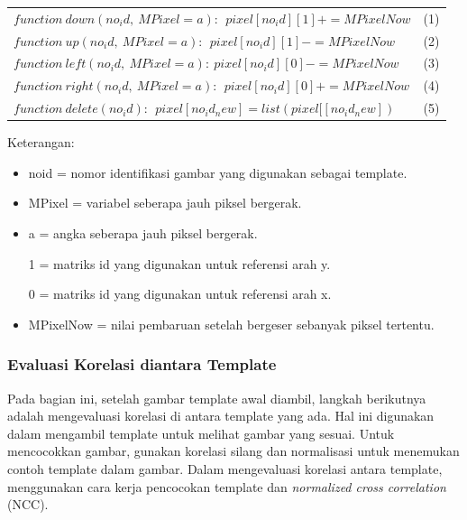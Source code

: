 \begin{table}[H]
	\begin{tabular}{lr}
		$function\ down\left(no_id,\ MPixel=a\right):\ \ pixel\left[no_id\right]\left[1\right]+=MPixelNow$ & (1) \\
		
		$function\ up\left(no_id,\ MPixel=a\right):\ \ pixel\left[no_id\right]\left[1\right]-=MPixelNow$ & (2) \\
		
		$function\ left\left(no_id,\ MPixel=a\right):\ pixel\left[no_id\right]\left[0\right]-=MPixelNow$ & (3) \\
		
		$function\ right\left(no_id,\ MPixel=a\right):\ \ pixel\left[no_id\right]\left[0\right]+=MPixelNow$ & (4) \\
		
		$function\ delete\left(no_id\right):\ \ pixel\left[no_id_new\right]=list(pixel[[no_id_new])$ & (5)
	\end{tabular}
\end{table}
Keterangan:
\begin{itemize}
	\item no\textunderscore id = nomor identifikasi gambar yang digunakan sebagai template.
	
	\item MPixel = variabel seberapa jauh piksel bergerak.
	
	\item a = angka seberapa jauh piksel bergerak.
	
	\item [1] = matriks id yang digunakan untuk referensi arah y.
	
	\item [0] = matriks id yang digunakan untuk referensi arah x.
	
	\item MPixelNow = nilai pembaruan setelah bergeser sebanyak piksel tertentu.
	
\end{itemize}

\subsubsection{Evaluasi Korelasi diantara Template}
\hspace{1,2cm}Pada bagian ini, setelah gambar template awal diambil, langkah berikutnya adalah mengevaluasi korelasi di antara template yang ada. Hal ini digunakan dalam mengambil template untuk melihat gambar yang sesuai. Untuk mencocokkan gambar, gunakan korelasi silang dan normalisasi untuk menemukan contoh template dalam gambar. Dalam mengevaluasi korelasi antara template, menggunakan cara kerja pencocokan template dan \textit{normalized cross correlation} (NCC).

